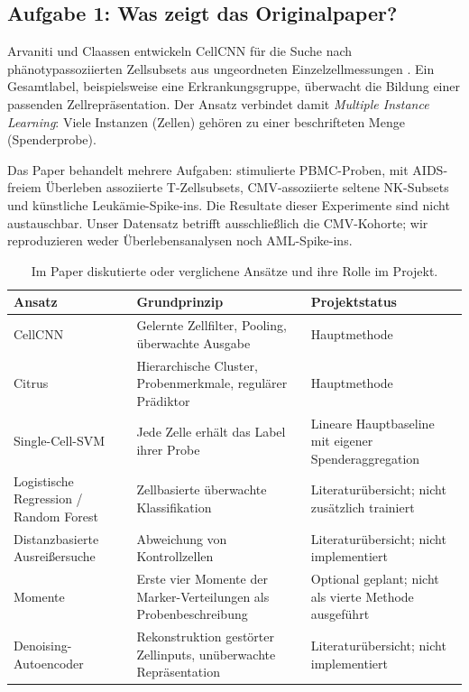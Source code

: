 \documentclass[11pt,a4paper]{article}
\begin{document}
\clearpage
\subsection*{Aufgabe 1: Was zeigt das Originalpaper?}
Arvaniti und Claassen entwickeln CellCNN für die Suche nach
phänotypassoziierten Zellsubsets aus ungeordneten Einzelzellmessungen
\cite{cellcnn}. Ein Gesamtlabel, beispielsweise eine Erkrankungsgruppe,
überwacht die Bildung einer passenden Zellrepräsentation. Der Ansatz
verbindet damit \emph{Multiple Instance Learning}: Viele Instanzen (Zellen)
gehören zu einer beschrifteten Menge (Spenderprobe).

Das Paper behandelt mehrere Aufgaben: stimulierte PBMC-Proben, mit
AIDS-freiem Überleben assoziierte T-Zellsubsets, CMV-assoziierte seltene
NK-Subsets und künstliche Leukämie-Spike-ins. Die Resultate dieser
Experimente sind nicht austauschbar. Unser Datensatz betrifft ausschließlich
die CMV-Kohorte; wir reproduzieren weder Überlebensanalysen noch AML-Spike-ins.

\begin{table}[!ht]\centering\small
\caption{Im Paper diskutierte oder verglichene Ansätze und ihre Rolle im Projekt.}
\begin{tabular}{p{3.5cm}p{7.2cm}p{4.5cm}}\toprule
Ansatz & Grundprinzip & Projektstatus\\\midrule
CellCNN & Gelernte Zellfilter, Pooling, überwachte Ausgabe & Hauptmethode\\
Citrus & Hierarchische Cluster, Probenmerkmale, regulärer Prädiktor & Hauptmethode\\
Single-Cell-SVM & Jede Zelle erhält das Label ihrer Probe & Lineare Hauptbaseline mit eigener Spenderaggregation\\
Logistische Regression / Random Forest & Zellbasierte überwachte Klassifikation & Literaturübersicht; nicht zusätzlich trainiert\\
Distanzbasierte Ausreißersuche & Abweichung von Kontrollzellen & Literaturübersicht; nicht implementiert\\
Momente & Erste vier Momente der Marker-Verteilungen als Probenbeschreibung & Optional geplant; nicht als vierte Methode ausgeführt\\
Denoising-Autoencoder & Rekonstruktion gestörter Zellinputs, unüberwachte Repräsentation & Literaturübersicht; nicht implementiert\\
\bottomrule\end{tabular}
\end{table}
\end{document}
